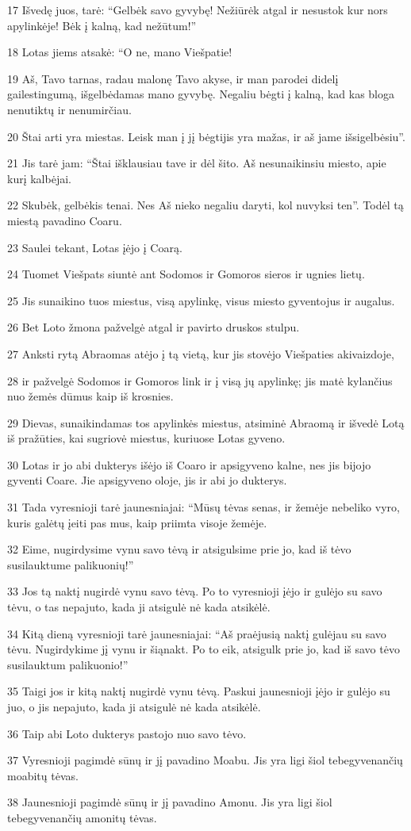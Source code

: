 \par 17 Išvedę juos, tarė: “Gelbėk savo gyvybę! Nežiūrėk atgal ir nesustok kur nors apylinkėje! Bėk į kalną, kad nežūtum!” 
\par 18 Lotas jiems atsakė: “O ne, mano Viešpatie! 
\par 19 Aš, Tavo tarnas, radau malonę Tavo akyse, ir man parodei didelį gailestingumą, išgelbėdamas mano gyvybę. Negaliu bėgti į kalną, kad kas bloga nenutiktų ir nenumirčiau. 
\par 20 Štai arti yra miestas. Leisk man į jį bėgti­jis yra mažas, ir aš jame išsigelbėsiu”. 
\par 21 Jis tarė jam: “Štai išklausiau tave ir dėl šito. Aš nesunaikinsiu miesto, apie kurį kalbėjai. 
\par 22 Skubėk, gelbėkis tenai. Nes Aš nieko negaliu daryti, kol nuvyksi ten”. Todėl tą miestą pavadino Coaru. 
\par 23 Saulei tekant, Lotas įėjo į Coarą. 
\par 24 Tuomet Viešpats siuntė ant Sodomos ir Gomoros sieros ir ugnies lietų. 
\par 25 Jis sunaikino tuos miestus, visą apylinkę, visus miesto gyventojus ir augalus. 
\par 26 Bet Loto žmona pažvelgė atgal ir pavirto druskos stulpu. 
\par 27 Anksti rytą Abraomas atėjo į tą vietą, kur jis stovėjo Viešpaties akivaizdoje, 
\par 28 ir pažvelgė Sodomos ir Gomoros link ir į visą jų apylinkę; jis matė kylančius nuo žemės dūmus kaip iš krosnies. 
\par 29 Dievas, sunaikindamas tos apylinkės miestus, atsiminė Abraomą ir išvedė Lotą iš pražūties, kai sugriovė miestus, kuriuose Lotas gyveno. 
\par 30 Lotas ir jo abi dukterys išėjo iš Coaro ir apsigyveno kalne, nes jis bijojo gyventi Coare. Jie apsigyveno oloje, jis ir abi jo dukterys. 
\par 31 Tada vyresnioji tarė jaunesniajai: “Mūsų tėvas senas, ir žemėje nebeliko vyro, kuris galėtų įeiti pas mus, kaip priimta visoje žemėje. 
\par 32 Eime, nugirdysime vynu savo tėvą ir atsigulsime prie jo, kad iš tėvo susilauktume palikuonių!” 
\par 33 Jos tą naktį nugirdė vynu savo tėvą. Po to vyresnioji įėjo ir gulėjo su savo tėvu, o tas nepajuto, kada ji atsigulė nė kada atsikėlė. 
\par 34 Kitą dieną vyresnioji tarė jaunesniajai: “Aš praėjusią naktį gulėjau su savo tėvu. Nugirdykime jį vynu ir šiąnakt. Po to eik, atsigulk prie jo, kad iš savo tėvo susilauktum palikuonio!” 
\par 35 Taigi jos ir kitą naktį nugirdė vynu tėvą. Paskui jaunesnioji įėjo ir gulėjo su juo, o jis nepajuto, kada ji atsigulė nė kada atsikėlė. 
\par 36 Taip abi Loto dukterys pastojo nuo savo tėvo. 
\par 37 Vyresnioji pagimdė sūnų ir jį pavadino Moabu. Jis yra ligi šiol tebegyvenančių moabitų tėvas. 
\par 38 Jaunesnioji pagimdė sūnų ir jį pavadino Amonu. Jis yra ligi šiol tebegyvenančių amonitų tėvas.



